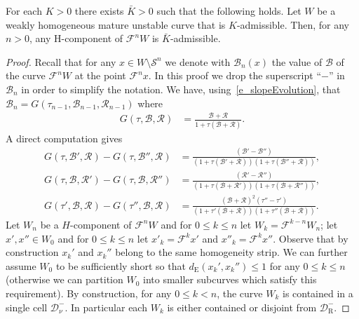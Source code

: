 \documentclass[10pt]{amsart}
\theoremstyle{definition}\newtheorem{defi}[theo]{Definition}\newtheorem{rema}[theo]{Remark}\newtheorem{exam}[theo]{Example}\newtheorem{exem}[theo]{Example}\newtheorem{nota}[theo]{Notation}
\newcommand{\cB}{\mathcal{B}}
\newcommand{\cpar}{\mathcal{R}}
\newcommand{\pslope}{\mathcal{B}}
\newcommand{\cm}{\mathcal{F}}
\newcommand{\cell}{\mathcal{D}}
\newcommand{\recoPrivate}{\mathrm{R}}
\newcommand{\reco}{{\cell^-_{\recoPrivate}}}
\newcommand{\eum}{_\text{E}}
\newcommand{\ppPrivate}[2]{#1^{#2}}
\newcommand{\prePrivate}[1]{\ppPrivate{#1}{-}}
\newcommand{\prpslope}{\prePrivate{\pslope}}
\newcommand{\singPrivate}{\mathcal{S}}
\newcommand{\sing}[1]{\singPrivate^{#1}}
\newcommand{\admiss}{admissible}
\newcommand{\indCell}{\nu}
\renewcommand{\prpslope}{\cB}
\renewcommand{\prpslope}{\cB}
\renewcommand{\prpslope}{\cB}
\begin{document}
\begin{prop}\label{PrBHold}
For each $K > 0$ there exists $\bar{K} > 0$ such that the following holds. Let $W$ be a weakly homogeneous mature unstable curve that is $K$-\admiss{}. Then, for any $n > 0$, any H-component of $\cm^{n}W$ is $\bar K$-\admiss{}.
\end{prop}
\begin{proof}
Recall that for any $x\in W\setminus\sing{n}$ we denote with $\prpslope_{n}(x)$ the value of $\prpslope$ of the curve $\cm^{n}W$ at the point $\cm^{n}x$. In this proof we drop the superscript ``$-$'' in $\prpslope_n$ in order to simplify the notation. We have, using~\eqref{e_slopeEvolution}, that $\cB_n=G(\tau_{n-1}, \cB_{n-1}, \cpar_{n-1})$ where
\begin{align*}
G(\tau, \cB, \cpar) &= \frac{\cB+\cpar}{1+\tau(\cB+\cpar)}.
\end{align*}
A direct computation gives
\begin{subequations}\label{DeltaG}
\begin{align}
G(\tau, \cB', \cpar)-G(\tau, \cB'', \cpar)&=\frac{ (\cB'-\cB'')}{(1+\tau(\cB'+\cpar))(1+\tau(\cB''+\cpar))}, \\
G(\tau, \cB, \cpar')-G(\tau, \cB, \cpar'')&=\frac{ (\cpar'-\cpar'')}{(1+\tau(\cB+\cpar'))(1+\tau(\cB+\cpar''))},\\
G(\tau', \cB, \cpar)-G(\tau'', \cB, \cpar)&=\frac{(\cB+\cpar)^2 (\tau''-\tau')}{(1+\tau'(\cB+\cpar))(1+\tau''(\cB+\cpar))}.\label{e_DeltaG-tau}
\end{align}
\end{subequations}
Let $W_{n}$ be a $H$-component of $\cm^{n}W$ and for $0 \le k \le n $ let $W_k = \cm^{k-n}W_n$; let $x',x''\in W_0$ and for $0 \le k \le n $ let $x'_k = \cm^{k}x'$ and $x''_{k} = \cm^{k}x''$. Observe that by construction $x_k'$ and $x_k''$ belong to the same homogeneity strip. We can further assume $W_0$ to be sufficiently short so that $d\eum(x_k', x_k'')\leq 1$ for any $0\le k\le n$ (otherwise we can partition $W_{0}$ into smaller subcurves which satisfy this requirement). By construction, for any $0\le k < n$, the curve $W_{k}$ is contained in a single cell $\cell^{-}_{\indCell}$. In particular each $W_{k}$ is either contained or disjoint from $\reco$.


\end{proof}
\end{document}
